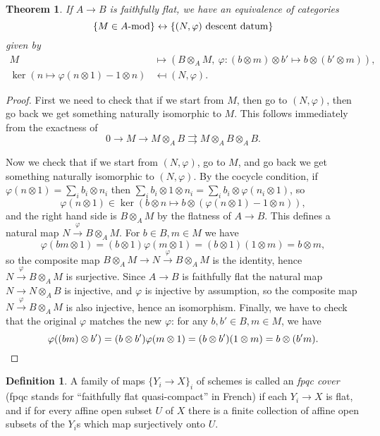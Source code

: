 \documentclass[letterpaper,11pt]{article}
\newtheorem{thm}{Theorem}
\theoremstyle{definition}
\newtheorem{defn}{Definition}
\theoremstyle{remark}
\begin{document}
\begin{thm} If $A \rightarrow B$ is faithfully flat, we have an equivalence of categories
\[
\{M \in A\mbox{\rm -mod}\} \leftrightarrow \{(N,\varphi) \mbox{\rm{ descent datum}}\}
\]
given by
\begin{align*}
M &\mapsto (B\otimes_A M,\ \varphi:(b\otimes m)\otimes b' \mapsto b\otimes (b'\otimes m)),\\
\ker(n\mapsto \varphi(n\otimes 1)-1\otimes n) &\mapsfrom (N,\varphi).
\end{align*}
\end{thm}
\begin{proof} First we need to check that if we start from $M$, then go to $(N,\varphi)$, then go back we get something naturally isomorphic to $M$. This follows immediately from the exactness of
\[
0 \rightarrow M \rightarrow M\otimes_AB \rightrightarrows M\otimes_AB\otimes_AB.
\]

Now we check that if we start from $(N,\varphi)$, go to $M$, and go back we get something naturally isomorphic to $(N,\varphi)$. By the cocycle condition, if $\varphi(n\otimes 1) = \sum_i b_i\otimes n_i$ then $\sum_i b_i\otimes 1\otimes n_i = \sum_i b_i\otimes \varphi(n_i\otimes 1)$, so
\[
\varphi(n\otimes 1) \in \ker(b\otimes n \mapsto b\otimes (\varphi(n\otimes 1)-1\otimes n)),
\]
and the right hand side is $B\otimes_A M$ by the flatness of $A\rightarrow B$. This defines a natural map $N \stackrel{\varphi}{\rightarrow} B\otimes_AM$. For $b \in B, m \in M$ we have
\[
\varphi(bm\otimes 1) = (b\otimes 1)\varphi(m\otimes 1) = (b\otimes 1)(1\otimes m) = b\otimes m,
\]
so the composite map $B\otimes_A M \rightarrow N \stackrel{\varphi}{\rightarrow} B\otimes_AM$ is the identity, hence $N\stackrel{\varphi}{\rightarrow} B\otimes_AM$ is surjective. Since $A\rightarrow B$ is faithfully flat the natural map $N \rightarrow N\otimes_AB$ is injective, and $\varphi$ is injective by assumption, so the composite map $N\stackrel{\varphi}{\rightarrow} B\otimes_AM$ is also injective, hence an isomorphism. Finally, we have to check that the original $\varphi$ matches the new $\varphi$: for any $b,b'\in B, m \in M$, we have
\[
\varphi((bm)\otimes b') = (b\otimes b')\varphi(m\otimes 1) = (b\otimes b')(1\otimes m) = b\otimes (b'm).\qedhere
\]
\end{proof}

\begin{defn} A family of maps $\{Y_i \rightarrow X\}_i$ of schemes is called an \emph{fpqc cover} (fpqc stands for ``faithfully flat quasi-compact'' in French) if each $Y_i \rightarrow X$ is flat, and if for every affine open subset $U$ of $X$ there is a finite collection of affine open subsets of the $Y_i$s which map surjectively onto $U$.
\end{defn}
\end{document}
